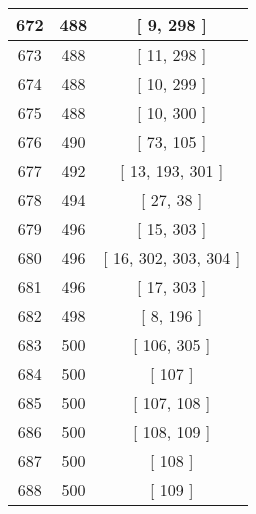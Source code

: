 \begin{center}
\begin{longtable}[H]{|| c c c ||}
\hline
672 & 488 & [ 9, 298 ] \\ 
\hline
673 & 488 & [ 11, 298 ] \\ 
\hline
674 & 488 & [ 10, 299 ] \\ 
\hline
675 & 488 & [ 10, 300 ] \\ 
\hline
676 & 490 & [ 73, 105 ] \\ 
\hline
677 & 492 & [ 13, 193, 301 ] \\ 
\hline
678 & 494 & [ 27, 38 ] \\ 
\hline
679 & 496 & [ 15, 303 ] \\ 
\hline
680 & 496 & [ 16, 302, 303, 304 ] \\ 
\hline
681 & 496 & [ 17, 303 ] \\ 
\hline
682 & 498 & [ 8, 196 ] \\ 
\hline
683 & 500 & [ 106, 305 ] \\ 
\hline
684 & 500 & [ 107 ] \\ 
\hline
685 & 500 & [ 107, 108 ] \\ 
\hline
686 & 500 & [ 108, 109 ] \\ 
\hline
687 & 500 & [ 108 ] \\ 
\hline
688 & 500 & [ 109 ] \\ 
\hline
\end{longtable}
\end{center}
